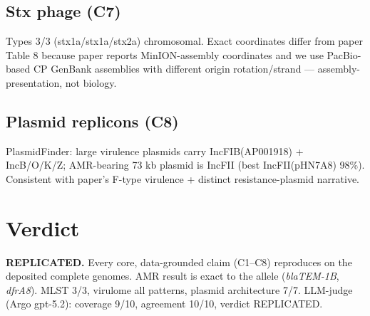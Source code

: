 \documentclass[11pt]{article}
\begin{document}
\subsection*{Stx phage (C7)}
Types 3/3 (stx1a/stx1a/stx2a) chromosomal. Exact coordinates differ from paper Table 8
because paper reports MinION-assembly coordinates and we use PacBio-based CP GenBank
assemblies with different origin rotation/strand --- assembly-presentation, not biology.

\subsection*{Plasmid replicons (C8)}
PlasmidFinder: large virulence plasmids carry IncFIB(AP001918) + IncB/O/K/Z; AMR-bearing
73 kb plasmid is IncFII (best IncFII(pHN7A8) 98\%). Consistent with paper's F-type virulence +
distinct resistance-plasmid narrative.

\section{Verdict}
\textbf{REPLICATED.} Every core, data-grounded claim (C1--C8) reproduces on the deposited
complete genomes. AMR result is exact to the allele (\textit{blaTEM-1B}, \textit{dfrA8}).
MLST 3/3, virulome all patterns, plasmid architecture 7/7. LLM-judge (Argo gpt-5.2):
coverage 9/10, agreement 10/10, verdict REPLICATED.
\end{document}
